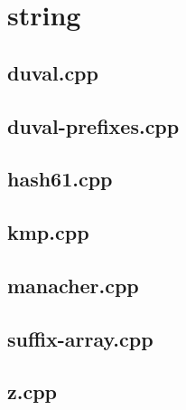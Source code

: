 \section{string}

\subsection{duval.cpp}


\subsection{duval-prefixes.cpp}


\subsection{hash61.cpp}


\subsection{kmp.cpp}


\subsection{manacher.cpp}


\subsection{suffix-array.cpp}


\subsection{z.cpp}


